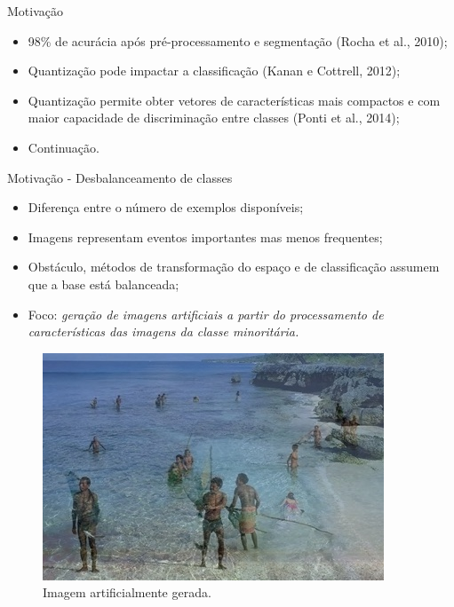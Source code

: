 \documentclass{beamer}
\begin{document}
\begin{frame}{Motivação}
\setlength\leftmargini{0em}
\justifying
  \begin{itemize}
\justifying
    \item 98\% de acurácia após pré-processamento e segmentação (Rocha et al., 2010); %
    \item Quantização pode impactar a classificação (Kanan e Cottrell, 2012);
    \item Quantização permite obter vetores de características mais compactos e com maior capacidade de discriminação entre classes (Ponti et al., 2014);
    \item[]  {Continuação.}
  \end{itemize}
\end{frame}
\begin{frame}{Motivação - Desbalanceamento de classes}
\setlength\leftmargini{0em}
\justifying
  \begin{itemize}
    \item Diferença entre o número de exemplos disponíveis;
    \item Imagens representam eventos importantes mas menos frequentes;
    \item Obstáculo, métodos de transformação do espaço e de 
    classificação assumem que a base está balanceada;
    \item Foco: \emph{geração de imagens artificiais a partir do processamento de características das imagens da classe minoritária.}
  \end{itemize}
  \begin{figure}[htbp]
 \begin{center}
   \includegraphics[width=.4\linewidth]{figuras/imagemgerada.jpg}
 \caption{Imagem artificialmente gerada.}
 \end{center}
\end{figure}

\end{frame}
\end{document}
